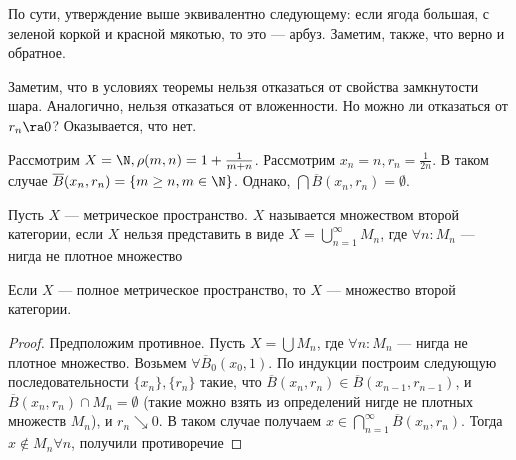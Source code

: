 \begin{proposition}
    По сути, утверждение выше эквивалентно следующему: если ягода большая, с зеленой коркой и красной мякотью, то это --- арбуз. Заметим, также, что верно и обратное.
\end{proposition}

\begin{note}
    Заметим, что в условиях теоремы нельзя отказаться от свойства замкнутости шара. Аналогично, нельзя отказаться от вложенности. Но можно ли отказаться от \(r_n \ra 0\)? Оказывается, что нет.
\end{note}

\begin{example}
    Рассмотрим \(X = \N, \rho(m, n) = 1 + \frac{1}{m + n}\). Рассмотрим \(x_n = n, r_n = \frac{1}{2n}\). В таком случае \(\overline{B}(x_n, r_n) = \{m \ge n, m \in \N\}\). Однако, \(\bigcap \overline{B}(x_n, r_n) = \emptyset\).
\end{example}

\begin{definition}
    Пусть \(X\) --- метрическое пространство. \(X\) называется множеством второй категории, если \(X\) нельзя представить в виде \(X = \bigcup_{n = 1}^\infty M_n\), где \(\forall n: M_n\) --- нигда не плотное множество
\end{definition}

\begin{theorem}[Бэр]
    Если \(X\) --- полное метрическое пространство, то \(X\) --- множество второй категории.
\end{theorem}
\begin{proof}
    Предположим противное. Пусть \(X = \bigcup M_n\), где \(\forall n: M_n\) --- нигда не плотное множество. Возьмем \(\forall \overline{B}_0(x_0, 1)\). По индукции построим следующую последовательности \(\{x_n\}, \{r_n\} \) такие, что \(\overline{B}(x_n, r_n) \in \overline{B}(x_{n - 1}, r_{n - 1}) \), и \(\overline{B}(x_n, r_n) \cap M_n = \emptyset\) (такие можно взять из определений нигде не плотных множеств \(M_n\)), и \(r_n \searrow 0\). В таком случае получаем \(x \in \bigcap_{n = 1}^\infty \overline{B}(x_n, r_n)\). Тогда \(x \notin M_n \forall n\), получили противоречие
\end{proof}

